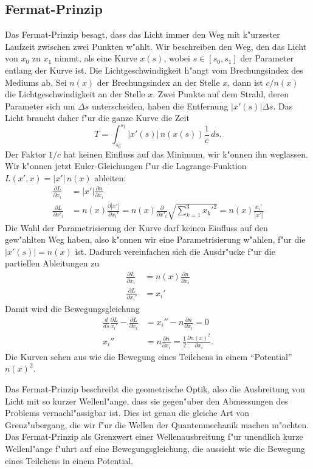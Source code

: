 \subsection{Fermat-Prinzip}
Das Fermat-Prinzip besagt, dass das Licht immer den Weg mit k"urzester
Laufzeit zwischen zwei Punkten w"ahlt.
Wir beschreiben den Weg, den das Licht von $x_0$ zu $x_1$ nimmt,
als eine Kurve $x(s)$, wobei $s\in[s_0,s_1]$ der Parameter entlang
der Kurve ist.
Die Lichtgeschwindigkeit h"angt vom Brechungsindex des Mediums ab.
Sei $n(x)$ der Brechungsindex an der Stelle $x$, dann ist 
$c/n(x)$ die Lichtgeschwindigkeit an der Stelle $x$.
Zwei Punkte auf dem Strahl, deren Parameter sich um $\Delta s$
unterscheiden, haben die  Entfernung $|x'(s)|\Delta s$.
Das Licht braucht daher f"ur die ganze Kurve die Zeit
\[
T=\int_{s_0}^{s_1} |x'(s)|\, n(x(s))\frac1c\,ds.
\]
Der Faktor $1/c$ hat keinen Einfluss auf das Minimum, wir k"onnen ihn
weglassen.
Wir k"onnen jetzt Euler-Gleichungen f"ur die Lagrange-Funktion
$L(x', x)= |x'|\,n(x)$ 
ableiten:
\begin{align*}
\frac{\partial L}{\partial x_i}
&=
|x'|\frac{\partial n}{\partial x_i}
\\
\frac{\partial L}{\partial x'_i}
&=
n(x)\frac{\partial |x'|}{\partial x_i'}
=
n(x)\frac{\partial}{\partial x'_i}\sqrt{\sum_{k=1}^3x_k'^2}
=
n(x)\frac{x_i'}{|x'|}
\end{align*}
Die Wahl der Parametrisierung der Kurve darf keinen Einfluss auf den
gew"ahlten Weg haben, also k"onnen wir eine Parametrisierung w"ahlen,
f"ur die $|x'(s)|=n(x)$ ist.
Dadurch vereinfachen sich die Ausdr"ucke f"ur die partiellen
Ableitungen zu
\begin{align*}
\frac{\partial L}{\partial x_i}
&=
n(x)\frac{\partial n}{\partial x_i}
\\
\frac{\partial L}{\partial x_i'}
&=x_i'
\end{align*}
Damit wird die Bewegungsgleichung
\begin{align*}
\frac{d}{ds}\frac{\partial L}{x_i'}-\frac{\partial L}{\partial x_i}
&=
x_i''-n\frac{\partial n}{\partial x_i}=0
\\
x_i''
&=
n\frac{\partial n}{\partial x_i}=\frac12 \frac{\partial n(x)^2}{\partial x_i}.
\end{align*}
Die Kurven sehen aus wie die Bewegung eines Teilchens in einem
``Potential'' $n(x)^2$.

Das Fermat-Prinzip beschreibt die geometrische Optik, also die Ausbreitung
von Licht mit so kurzer Wellenl"ange, dass sie gegen"uber den
Abmessungen des Problems vernachl"assigbar ist.
Dies ist genau die gleiche Art von Grenz"ubergang, die wir f"ur
die Wellen der Quantenmechanik machen m"ochten.
Das Fermat-Prinzip als Grenzwert einer Wellenausbreitung f"ur
unendlich kurze Wellenl"ange f"uhrt auf eine Bewegungsgleichung,
die aussieht wie die Bewegung eines Teilchens in einem Potential.

